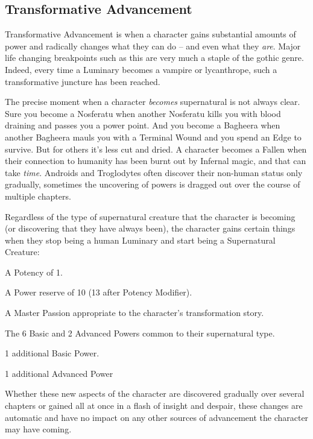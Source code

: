 \subsection{Transformative Advancement}

Transformative Advancement is when a character gains substantial amounts of power and radically changes what they can do -- and even what they \textit{are}. Major life changing breakpoints such as this are very much a staple of the gothic genre. Indeed, every time a Luminary becomes a vampire or lycanthrope, such a transformative juncture has been reached.

The precise moment when a character \textit{becomes} supernatural is not always clear. Sure you become a Nosferatu when another Nosferatu kills you with blood draining and passes you a power point. And you become a Bagheera when another Bagheera mauls you with a Terminal Wound and you spend an Edge to survive. But for others it's less cut and dried. A character becomes a Fallen when their connection to humanity has been burnt out by Infernal magic, and that can take \textit{time}. Androids and Troglodytes often discover their non-human status only gradually, sometimes the uncovering of powers is dragged out over the course of multiple chapters.

Regardless of the type of supernatural creature that the character is becoming (or discovering that they have always been), the character gains certain things when they stop being a human Luminary and start being a Supernatural Creature:

\begin{itemize*}
\item A Potency of 1.
\item A Power reserve of 10 (13 after Potency Modifier).
\item A Master Passion appropriate to the character's transformation story.
\item The 6 Basic and 2 Advanced Powers common to their supernatural type.
\item 1 additional Basic Power.
\item 1 additional Advanced Power
\end{itemize*}

Whether these new aspects of the character are discovered gradually over several chapters or gained all at once in a flash of insight and despair, these changes are automatic and have no impact on any other sources of advancement the character may have coming.

